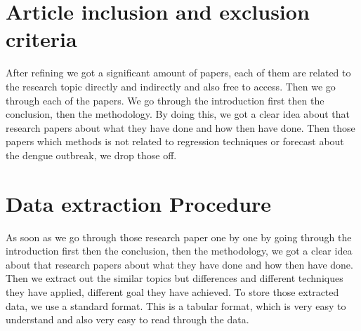 \documentclass{article}
\begin{document}
\section{Article inclusion and exclusion criteria}
After refining we got a significant amount of papers, each of them are related to the research topic directly and indirectly and also free to access. Then we go through each of the papers.
We go through the introduction first then the conclusion, then the methodology. By doing this, we got a clear idea about that research papers about what they have done and how then have done.
Then those papers which methods is not related to regression techniques or forecast about the dengue outbreak, we drop those off.

\section{Data extraction Procedure}
As soon as we go through those research paper one by one by going through the introduction first then the conclusion, then the methodology, we got a clear idea about that research papers
about what they have done and how then have done. Then we extract out the similar topics but differences and different techniques they have applied, different goal they have achieved.
To store those extracted data, we use a standard format. This is a tabular format, which is very easy to understand and also very easy to read through the data.


% 
%
\end{document}
